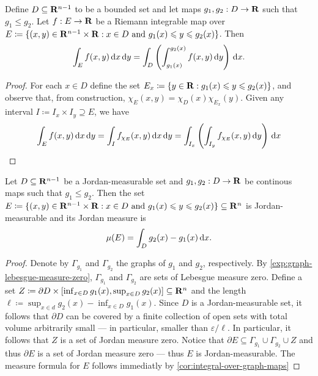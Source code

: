 \begin{corollary}
\label{cor:integral-over-graph-maps}
Define \(D \subseteq \mathbf{R}^{n-1}\) to be a bounded set and let maps \(g_{1}, g_{2}:
D \to \mathbf{R}\) such that \(g_1 \leq g_2\). Let \(f: E \to \mathbf{R}\) be a Riemann
integrable map over \(E \coloneq \{(x, y) \in \mathbf{R}^{n - 1} \times \mathbf{R} : x \in D
\text{ and } g_1(x) \leqslant y \leqslant g_2(x)\}\). Then
\[
  \int_E f(x, y)\, \mathrm{d} x\, \mathrm{d} y
  = \int_D \left( \int_{g_1(x)}^{g_2(x)} f(x, y)\, \mathrm{d} y \right)\, \mathrm{d} x.
\]
\end{corollary}

\begin{proof}
For each \(x \in D\) define the set \(E_x \coloneq \{y \in \mathbf{R} : g_{1}(x) \leqslant y
\leqslant g_2(x)\}\), and observe that, from construction, \(\chi_E(x, y) = \chi_D(x)
\chi_{E_x}(y)\). Given any interval \(I \coloneq I_x \times I_y \supseteq E\),
we have
\begin{align*}
  \int_E f(x, y)\, \mathrm{d} x\, \mathrm{d} y
  = \int_I f_{\chi_E}(x, y)\, \mathrm{d} x\, \mathrm{d} y
  = \int_{I_x} \left( \int_{I_y} f_{\chi_E}(x, y)\, \mathrm{d} y  \right)\, \mathrm{d} x
\end{align*}
\end{proof}

\begin{corollary}
\label{cor:measure-set-between-graphs-of-continuous-maps}
Let \(D \subseteq \mathbf{R}^{n-1}\) be a Jordan-measurable set and \(g_1, g_2: D \to
\mathbf{R}\) be continous maps such that \(g_1 \leq g_2\). Then the set \(E \coloneq
\{(x, y) \in \mathbf{R}^{n-1} \times \mathbf{R} : x \in D \text{ and } g_1(x) \leqslant y \leqslant
g_2(x)\} \subseteq \mathbf{R}^n\) is Jordan-measurable and its Jordan measure is
\[
  \mu(E) = \int_D g_2(x) - g_1(x)\, \mathrm{d} x.
\]
\end{corollary}

\begin{proof}
Denote by \(\Gamma_{g_1}\) and \(\Gamma_{g_2}\) the graphs of \(g_1\) and
\(g_2\), respectively. By \cref{exp:graph-lebesgue-measure-zero},
\(\Gamma_{g_1}\) and \(\Gamma_{g_2}\) are sets of Lebesgue measure
zero. Define a set \(Z \coloneq \partial D \times [\inf_{x \in D} g_1(x),
\sup_{x \in D} g_2(x)] \subseteq \mathbf{R}^n\) and the length \(\ell \coloneq \sup_{x
\in d} g_2(x) - \inf_{x \in D} g_1(x)\). Since \(D\) is a Jordan-measurable set,
it follows that \(\partial D\) can be covered by a finite collection of open
sets with total volume arbitrarily small --- in particular, smaller than
\(\varepsilon / \ell\). In particular, it follows that \(Z\) is a set of Jordan
measure zero. Notice that \(\partial E \subseteq \Gamma_{g_1} \cup
\Gamma_{g_2} \cup Z\) and thus \(\partial E\) is a set of Jordan measure zero
--- thus \(E\) is Jordan-measurable. The measure formula for \(E\) follows
immediatly by \cref{cor:integral-over-graph-maps}
\end{proof}

